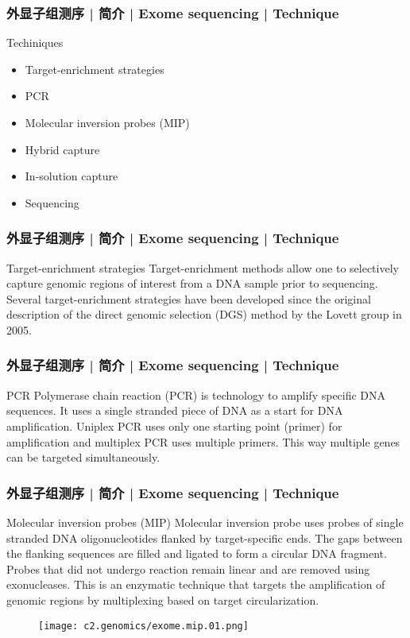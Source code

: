 \begin{frame}
  \frametitle{外显子组测序 | 简介 | Exome sequencing | Technique}
  \begin{block}{Techiniques}
    \begin{itemize}
      \item Target-enrichment strategies
      \item PCR
      \item Molecular inversion probes (MIP)
      \item Hybrid capture
      \item In-solution capture
      \item Sequencing
    \end{itemize}
  \end{block}
\end{frame}

\begin{frame}
  \frametitle{外显子组测序 | 简介 | Exome sequencing | Technique}
  \begin{block}{Target-enrichment strategies}
    Target-enrichment methods allow one to selectively capture genomic regions of interest from a DNA sample prior to sequencing. Several target-enrichment strategies have been developed since the original description of the direct genomic selection (DGS) method by the Lovett group in 2005.
  \end{block}
\end{frame}

\begin{frame}
  \frametitle{外显子组测序 | 简介 | Exome sequencing | Technique}
  \begin{block}{PCR}
    Polymerase chain reaction (PCR) is technology to amplify specific DNA sequences. It uses a single stranded piece of DNA as a start for DNA amplification. Uniplex PCR uses only one starting point (primer) for amplification and multiplex PCR uses multiple primers. This way multiple genes can be targeted simultaneously.
  \end{block}
\end{frame}

\begin{frame}
  \frametitle{外显子组测序 | 简介 | Exome sequencing | Technique}
  \begin{block}{Molecular inversion probes (MIP)}
    Molecular inversion probe uses probes of single stranded DNA oligonucleotides flanked by target-specific ends. The gaps between the flanking sequences are filled and ligated to form a circular DNA fragment. Probes that did not undergo reaction remain linear and are removed using exonucleases. This is an enzymatic technique that targets the amplification of genomic regions by multiplexing based on target circularization.
  \end{block}
  \begin{figure}
    \centering
    \texttt{[image: c2.genomics/exome.mip.01.png]}
  \end{figure}
\end{frame}

